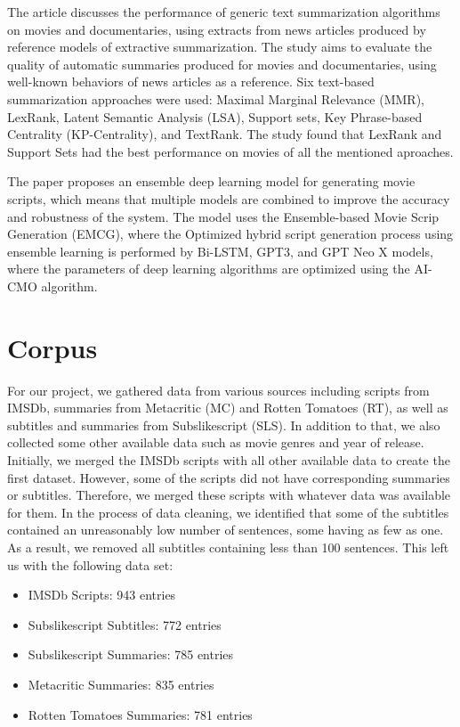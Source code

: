 \documentclass[fleqn,moreauthors,10pt]{ds_report}
\begin{document}
The article \cite{APARICIO20167} discusses the performance of generic text summarization algorithms on movies and documentaries, using extracts from news articles produced by reference models of extractive summarization. The study aims to evaluate the quality of automatic summaries produced for movies and documentaries, using well-known behaviors of news articles as a reference. Six text-based summarization approaches were used: Maximal Marginal Relevance (MMR), LexRank, Latent Semantic Analysis (LSA), Support sets, Key Phrase-based Centrality (KP-Centrality), and TextRank. The study found that LexRank and Support Sets had the best performance on movies of all the mentioned aproaches.

The paper \cite{DHARANIYA2023102150} proposes an ensemble deep learning model for generating movie scripts, which means that multiple models are combined to improve the accuracy and robustness of the system.  The model uses the Ensemble-based Movie Scrip Generation (EMCG), where the Optimized hybrid script generation process using ensemble learning is performed by Bi-LSTM, GPT3, and GPT Neo X models, where the parameters of deep learning algorithms are optimized using the AI-CMO algorithm.

\section*{Corpus}

For our project, we gathered data from various sources including scripts from IMSDb, summaries from Metacritic (MC) and Rotten Tomatoes (RT), as well as subtitles and summaries from Subslikescript (SLS). In addition to that, we also collected some other available data such as movie genres and year of release. Initially, we merged the IMSDb scripts with all other available data to create the first dataset. However, some of the scripts did not have corresponding summaries or subtitles. Therefore, we merged these scripts with whatever data was available for them. In the process of data cleaning, we identified that some of the subtitles contained an unreasonably low number of sentences, some having as few as one. As a result, we removed all subtitles containing less than 100 sentences. This left us with the following data set:
\begin{itemize}
  \item IMSDb Scripts: 943 entries
  \item Subslikescript Subtitles: 772 entries
  \item Subslikescript Summaries: 785 entries
  \item Metacritic Summaries: 835 entries
  \item Rotten Tomatoes Summaries: 781 entries
\end{itemize}
\end{document}
